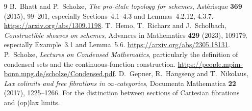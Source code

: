 \documentclass[11pt,a4paper]{article}
\numberwithin{equation}{section}
\theoremstyle{definition}
\theoremstyle{remark}
\begin{document}
\begin{thebibliography}{9}
B.~Bhatt and P.~Scholze, \emph{The pro-\'{e}tale topology for schemes},
Ast\'{e}risque \textbf{369} (2015), 99--201, especially
Sections~4.1--4.3 and Lemmas~4.2.12, 4.3.7.
\url{https://arxiv.org/abs/1309.1198}.
T.~Hemo, T.~Richarz and J.~Scholbach,
\emph{Constructible sheaves on schemes},
Advances in Mathematics \textbf{429} (2023), 109179,
especially Example~3.1 and Lemma~5.6.
\url{https://arxiv.org/abs/2305.18131}.
P.~Scholze, \emph{Lectures on Condensed Mathematics},
particularly the definition of condensed sets and the
continuous-function construction.
\url{https://people.mpim-bonn.mpg.de/scholze/Condensed.pdf}.
D.~Gepner, R.~Haugseng and T.~Nikolaus,
\emph{Lax colimits and free fibrations in $\infty$-categories},
Documenta Mathematica \textbf{22} (2017), 1225--1266.
For the distinction between sections of Cartesian fibrations and
(op)lax limits.
\end{thebibliography}
\end{document}
